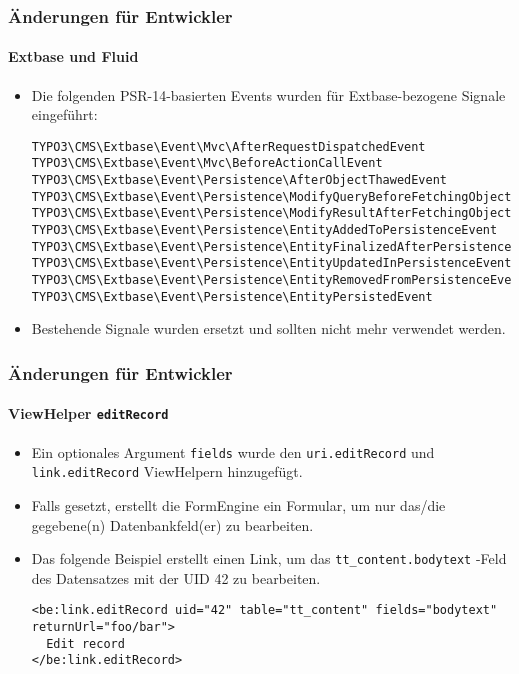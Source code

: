 \begin{frame}[fragile]
	\frametitle{Änderungen für Entwickler}
	\framesubtitle{Extbase und Fluid}

	\lstset{basicstyle=\tiny\ttfamily}

	\begin{itemize}
		\item Die folgenden PSR-14-basierten Events wurden für Extbase-bezogene Signale eingeführt:

\vspace{-0.4cm}
\begin{lstlisting}
TYPO3\CMS\Extbase\Event\Mvc\AfterRequestDispatchedEvent
TYPO3\CMS\Extbase\Event\Mvc\BeforeActionCallEvent
TYPO3\CMS\Extbase\Event\Persistence\AfterObjectThawedEvent
TYPO3\CMS\Extbase\Event\Persistence\ModifyQueryBeforeFetchingObjectDataEvent
TYPO3\CMS\Extbase\Event\Persistence\ModifyResultAfterFetchingObjectDataEvent
TYPO3\CMS\Extbase\Event\Persistence\EntityAddedToPersistenceEvent
TYPO3\CMS\Extbase\Event\Persistence\EntityFinalizedAfterPersistenceEvent
TYPO3\CMS\Extbase\Event\Persistence\EntityUpdatedInPersistenceEvent
TYPO3\CMS\Extbase\Event\Persistence\EntityRemovedFromPersistenceEvent
TYPO3\CMS\Extbase\Event\Persistence\EntityPersistedEvent
\end{lstlisting}

		\item Bestehende Signale wurden ersetzt und sollten nicht mehr verwendet werden.

	\end{itemize}

\end{frame}


\begin{frame}[fragile]
	\frametitle{Änderungen für Entwickler}
	\framesubtitle{ViewHelper \texttt{editRecord}}

	\lstset{basicstyle=\tiny\ttfamily}

	\begin{itemize}
		\item Ein optionales Argument \texttt{fields} wurde den
			\texttt{uri.editRecord} und \texttt{link.editRecord} ViewHelpern hinzugefügt.
		\item Falls gesetzt, erstellt die FormEngine ein Formular, um nur das/die gegebene(n) Datenbankfeld(er) zu bearbeiten.
		\item Das folgende Beispiel erstellt einen Link, um das \texttt{tt\_content.bodytext}
			-Feld des Datensatzes mit der UID 42 zu bearbeiten.

\begin{lstlisting}
<be:link.editRecord uid="42" table="tt_content" fields="bodytext" returnUrl="foo/bar">
  Edit record
</be:link.editRecord>
\end{lstlisting}

	\end{itemize}

\end{frame}

